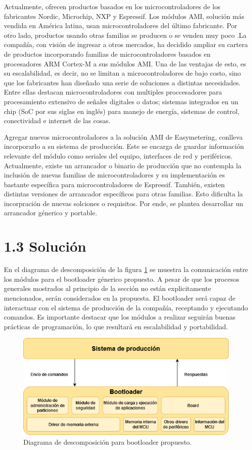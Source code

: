 \documentclass[
11pt, %
]{charter}
\begin{document}
Actualmente, ofrecen productos basados en los microcontroladores de los fabricantes Nordic, Microchip, NXP y Espressif. Los módulos AMI, solución más vendida en América latina, usan microcontroladores del último fabricante. Por otro lado, productos usando otras familias se producen o se venden muy poco  .La compañía, con visión de ingresar a otros mercados, ha decidido ampliar su cartera de productos incorporando familias de microcontroladores basados en procesadores ARM Cortex-M a sus módulos AMI. Una de las ventajas de esto, es su escalabilidad, es decir, no se limitan a microcontroladores de bajo costo, sino que los fabricantes han diseñado una serie de soluciones a distintas necesidades. Entre ellas destacan microcontroladores con multiples proccesadores para procesamiento extensivo de señales digitales o datos; sistemas integrados en un chip (SoC por sus siglas en inglés) para manejo de energía, sistemas de control, conectividad e internet de las cosas.

Agregar nuevos microcontroladores a la solución AMI de Easymetering, conlleva incorporarlo a su sistema de producción. Este se encarga de guardar información relevante del módulo como seriales del equipo, interfaces de red y periféricos. Actualmente, existe un arrancador o binario de producción que no contempla la inclusión de nuevas familias de microcontroladores y su implementación es bastante específica para microcontroladores de Espressif. También, existen distintas versiones de arrancador específicos para otras familias. Esto dificulta la incorpración de nuevas solciones o requisitos.  Por ende, se plantea desarrollar un arrancador génerico y portable.

\section{1.3 Solución}
\label{sec:s1Solución}

En el diagrama de descomposición de la figura \ref{fig:sec1BootloaderSolution} se muestra la comunicación entre los módulos para el bootloader génerico propuesto. A pesar de que los procesos generales mostrados al principio de la sección no están explicitamente mencionados, serán considerados en la propuesta. El bootloader será capaz de interactuar con el sistema de producción de la compañía, receptando y ejecutando comandos. Es importante destacar que los módulos a realizar seguirán buenas prácticas de programación, lo que resultará en escalabilidad y portabilidad. 

\begin{figure}[htpb]
\centering 
\includegraphics[width=.65\textwidth]{./Figuras/GdPDiagrams-sec1_solution.png}
\caption{Diagrama de descomposición para bootloader propuesto.}
\label{fig:sec1BootloaderSolution}
\end{figure}
\end{document}
